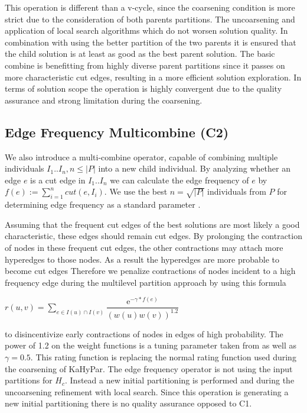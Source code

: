 \documentclass[a4paper,12pt,titlepage, BCOR7mm,headsepline]{scrbook}
\numberwithin{equation}{section}
\begin{document}
This operation is different than a v-cycle, since the coarsening condition is more strict due to the consideration of both parents partitions. The uncoarsening and application of local search algorithms which do not worsen solution quality. In combination with using the better partition of the two parents it is ensured that the child solution is at least as good as the best parent solution. \label{qualityassurance} The basic combine is benefitting from highly diverse parent partitions since it passes on more characteristic cut edges, resulting in a more efficient solution exploration. In terms of solution scope the operation is highly convergent due to the quality assurance and strong limitation during the coarsening. 


\subsection{Edge Frequency Multicombine (C2)}
\label{sec:edgefrequency}
We also introduce a multi-combine operator, capable of combining multiple individuals $I_1.. I_n, n \le |P|$ into a new child individual. By analyzing whether an edge $e$ is a cut edge in $I_1 ..I_n$ we can calculate the edge frequency \cite{wichlund1998multilevel} of $e$ by $f(e) := \sum_{i=1}^n cut(e,I_i)$. We use the best $n = \sqrt{|P|}$ individuals from $P$ for determining edge frequency as a standard parameter \cite{delling2011graph}. 

Assuming that the frequent cut edges of the best solutions are most likely a good characteristic, these edges should remain cut edges. By prolonging the contraction of nodes in these frequent cut edges, the other contractions may attach more hyperedges to those nodes. As a result the hyperedges are more probable to become cut edges
 Therefore we penalize contractions of nodes incident to a high frequency edge during the multilevel partition approach by using this formula
\begin{center}
$r(u,v) = \sum_{e \in I(u) \cap I(v)}\dfrac{\mathrm{e}^{-\gamma*f(e)}}{(w(u)w(v))^{1.2}}$ 
\end{center}





to disincentivize early contractions of nodes in edges of high probability. The power of 1.2 on the weight functions is a tuning parameter taken from \cite{delling2011graph} as well as $\gamma = 0.5$.
This rating function is replacing the normal rating function used during the coarsening of KaHyPar. 
The edge frequency operator is not using the input partitions for $H_c$. Instead a new initial partitioning is performed and during the uncoarsening refinement with local search.
Since this operation is generating a new initial partitioning there is no quality assurance opposed to C1.
\end{document}
